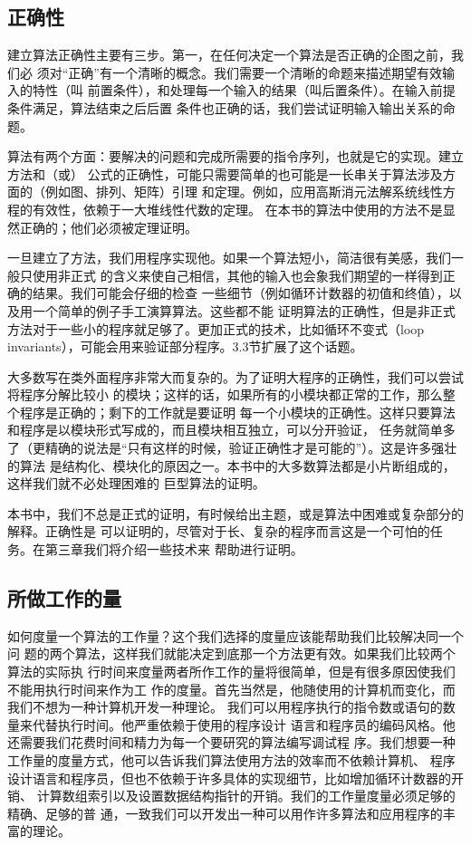 \subsection{正确性}
建立算法正确性主要有三步。第一，在任何决定一个算法是否正确的企图之前，我们必
须对“正确”有一个清晰的概念。我们需要一个清晰的命题来描述期望有效输入的特性（叫
前置条件），和处理每一个输入的结果（叫后置条件）。在输入前提条件满足，算法结束之后后置
条件也正确的话，我们尝试证明输入输出关系的命题。

算法有两个方面：要解决的问题和完成所需要的指令序列，也就是它的实现。建立方法和（或）
公式的正确性，可能只需要简单的也可能是一长串关于算法涉及方面的（例如图、排列、矩阵）引理
和定理。例如，应用高斯消元法解系统线性方程的有效性，依赖于一大堆线性代数的定理。
在本书的算法中使用的方法不是显然正确的；他们必须被定理证明。

一旦建立了方法，我们用程序实现他。如果一个算法短小，简洁很有美感，我们一般只使用非正式
的含义来使自己相信，其他的输入也会象我们期望的一样得到正确的结果。我们可能会仔细的检查
一些细节（例如循环计数器的初值和终值），以及用一个简单的例子手工演算算法。这些都不能
证明算法的正确性，但是非正式方法对于一些小的程序就足够了。更加正式的技术，比如循环不变式（loop
invariants），可能会用来验证部分程序。3.3节扩展了这个话题。

大多数写在类外面程序非常大而复杂的。为了证明大程序的正确性，我们可以尝试将程序分解比较小
的模块；这样的话，如果所有的小模块都正常的工作，那么整个程序是正确的；剩下的工作就是要证明
每一个小模块的正确性。这样只要算法和程序是以模块形式写成的，而且模块相互独立，可以分开验证，
任务就简单多了（更精确的说法是“只有这样的时候，验证正确性才是可能的”）。这是许多强壮的算法
是结构化、模块化的原因之一。本书中的大多数算法都是小片断组成的，这样我们就不必处理困难的
巨型算法的证明。

本书中，我们不总是正式的证明，有时候给出主题，或是算法中困难或复杂部分的解释。正确性是
可以证明的，尽管对于长、复杂的程序而言这是一个可怕的任务。在第三章我们将介绍一些技术来
帮助进行证明。


\subsection{所做工作的量}
如何度量一个算法的工作量？这个我们选择的度量应该能帮助我们比较解决同一个问
题的两个算法，这样我们就能决定到底那一个方法更有效。如果我们比较两个算法的实际执
行时间来度量两者所作工作的量将很简单，但是有很多原因使我们不能用执行时间来作为工
作的度量。首先当然是，他随使用的计算机而变化，而我们不想为一种计算机开发一种理论。
我们可以用程序执行的指令数或语句的数量来代替执行时间。他严重依赖于使用的程序设计
语言和程序员的编码风格。他还需要我们花费时间和精力为每一个要研究的算法编写调试程
序。我们想要一种工作量的度量方式，他可以告诉我们算法使用方法的效率而不依赖计算机、
程序设计语言和程序员，但也不依赖于许多具体的实现细节，比如增加循环计数器的开销、
计算数组索引以及设置数据结构指针的开销。我们的工作量度量必须足够的精确、足够的普
通，一致我们可以开发出一种可以用作许多算法和应用程序的丰富的理论。

